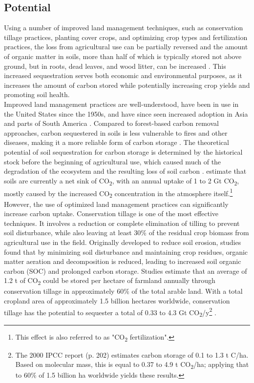 \subsection*{Potential}
Using a number of improved land management techniques, such as conservation tillage practices, planting cover crops, and optimizing crop types and fertilization practices, the loss from agricultural use can be partially reversed and the amount of organic matter in soils, more than half of which is typically stored not above ground, but in roots, dead leaves, and wood litter, can be increased \parencite[192]{Watson2000LandForestry, Ontl2012SoilStorage}. This increased sequestration serves both economic and environmental purposes, as it increases the amount of carbon stored while potentially increasing crop yields and promoting soil health. \parencite{Dipple2021TheSystems}\\
Improved land management practices are well-understood, have been in use in the United States since the 1950s, and have since seen increased adoption in Asia and parts of South America \parencite[202]{Watson2000LandForestry}. Compared to forest-based carbon removal approaches, carbon sequestered in soils is less vulnerable to fires and other diseases, making it a more reliable form of carbon storage \parencite{Dipple2021TheSystems}. The theoretical potential of soil sequestration for carbon storage is determined by the historical stock before the beginning of agricultural use, which caused much of the degradation of the ecosystem and the resulting loss of soil carbon \parencite{NAS2018NegativeAgenda}.
\textcite{Dipple2021TheSystems} estimate that soils are currently a net sink of CO\textsubscript{2}, with an annual uptake of 1 to 2 Gt CO\textsubscript{2}, mostly caused by the increased CO\textsubscript{2} concentration in the atmosphere itself.\footnote{This effect is also referred to as "CO\textsubscript{2} fertilization".}
However, the use of optimized land management practices can significantly increase carbon uptake. Conservation tillage is one of the most effective techniques. It involves a reduction or complete elimination of tilling to prevent soil disturbance, while also leaving at least 30\% of the residual crop biomass from agricultural use in the field. Originally developed to reduce soil erosion, studies found that by minimizing soil disturbance and maintaining crop residues, organic matter aeration and decomposition is reduced, leading to increased soil organic carbon (SOC) and prolonged carbon storage. Studies estimate that an average of 1.2 t of CO\textsubscript{2} could be stored per hectare of farmland annually through conservation tillage in approximately 60\% of the total arable land. With a total cropland area of approximately 1.5 billion hectares worldwide, conservation tillage has the potential to sequester a total of 0.33 to 4.3 Gt CO\textsubscript{2}/y\footnote{The 2000 IPCC report (p. 202) estimates carbon storage of 0.1 to 1.3 t C/ha. Based on molecular mass, this is equal to 0.37 to 4.9 t CO\textsubscript{2}/ha; applying that to 60\% of 1.5 billion ha worldwide yields these results.} \parencite{Watson2000LandForestry, NRC2015ClimateSequestration}.
